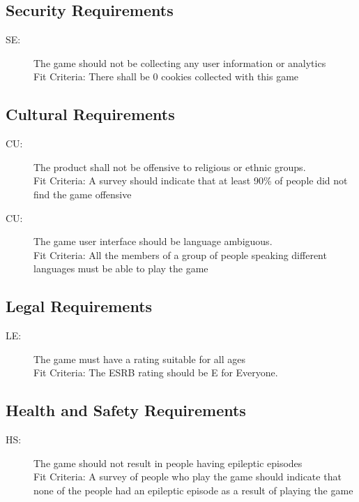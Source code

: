 \documentclass[12pt, titlepage]{article}
\newcounter{secreq}
\newcommand{\sethesecreq}{SE\thesecreq}
\newcounter{culreq}
\newcommand{\cultheculreq}{CU\theculreq}
\newcounter{legreq}
\newcommand{\legthelegreq}{LE\thelegreq}
\newcounter{hsreq}
\newcommand{\hsthehsreq}{HS\thehsreq}
\begin{document}
\subsection{Security Requirements}
\begin{description}
\item [ \sethesecreq:] The game should not be collecting any user information or analytics\\ Fit Criteria: There shall be 0 cookies collected with this game
\end{description}

\subsection{Cultural Requirements}
\begin{description}
\item [ \cultheculreq:] The product shall not be offensive to religious or ethnic groups. \\
Fit Criteria: A survey should indicate that at least 90\% of people did not find the game offensive
\item [ \cultheculreq:] The game user interface should be language ambiguous.\\
Fit Criteria: All the members of a group of people speaking different languages must be able to play the game
\end{description}

\subsection{Legal Requirements}
\begin{description}
\item [ \legthelegreq:] The game must have a rating suitable for all ages\\
Fit Criteria: The ESRB rating should be E for Everyone.
\end{description}

\subsection{Health and Safety Requirements}
\begin{description}
\item [ \hsthehsreq:] The game should not result in people having epileptic episodes\\
Fit Criteria: A survey of people who play the game should indicate that none of the people had an epileptic episode as a result of playing the game
\end{description}
\end{document}
